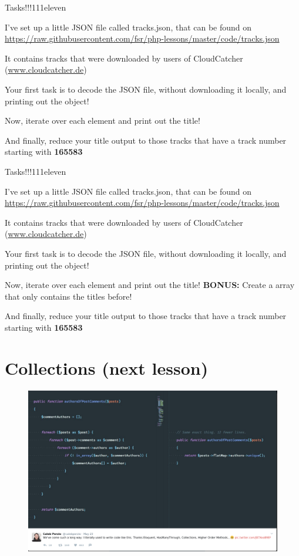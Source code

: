 \begin{frame}[fragile]{Tasks!!!111eleven}
	
	I've set up a little JSON file called tracks.json, that can be found on \url{https://raw.githubusercontent.com/fsr/php-lessons/master/code/tracks.json}
	
	It contains tracks that were downloaded by users of CloudCatcher (\url{www.cloudcatcher.de})\pause
	
	Your first task is to decode the JSON file, without downloading it locally, and printing out the object!\pause
	
	Now, iterate over each element and print out the title! \pause
	
	And finally, reduce your title output to those tracks that have a track number starting with \textbf{165583}
\end{frame}

\begin{frame}[fragile]{Tasks!!!111eleven}
	
	I've set up a little JSON file called tracks.json, that can be found on \url{https://raw.githubusercontent.com/fsr/php-lessons/master/code/tracks.json}
	
	It contains tracks that were downloaded by users of CloudCatcher (\url{www.cloudcatcher.de})\pause
	
	Your first task is to decode the JSON file, without downloading it locally, and printing out the object!\pause
	
	Now, iterate over each element and print out the title! \pause \textbf{BONUS:} Create a array that only contains the titles before!\pause
	
	And finally, reduce your title output to those tracks that have a track number starting with \textbf{165583}
\end{frame}

\section{Collections (next lesson)}

\begin{frame}[plain]
\begin{figure}
	\includegraphics[width=\linewidth]{img/herewecome.png}
\end{figure}
\end{frame}




